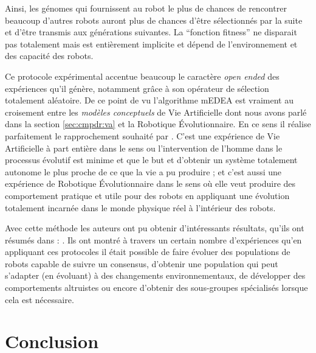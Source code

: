 Ainsi, les génomes qui fournissent au robot le plus de chances de rencontrer beaucoup d'autres robots auront plus de chances d'être sélectionnés par la suite et d'être transmis aux générations suivantes. La ``fonction fitness'' ne disparait pas totalement mais est entièrement implicite et dépend de l'environnement et des capacité des robots.

Ce protocole expérimental accentue beaucoup le caractère \emph{open ended} des expériences qu'il génère, notamment grâce à son opérateur de sélection totalement aléatoire. De ce point de vu l'algorithme mEDEA est vraiment au croisement entre les \emph{modèles conceptuels} de Vie Artificielle dont nous avons parlé dans la section \ref{sec:cmpdr:va} et la Robotique \'Evolutionnaire. En ce sens il réalise parfaitement le rapprochement souhaité par \cite{watson02embodiedevolutiondistributingevolutionaryalgorithmpopulationrobots}. C'est une expérience de Vie Artificielle à part entière dans le sens ou l'intervention de l'homme dans le processus évolutif est minime et que le but et d'obtenir un système totalement autonome le plus proche de ce que la vie a pu produire ; et c'est aussi une expérience de Robotique \'Evolutionnaire dans le sens où elle veut produire des comportement pratique et utile pour des robots en appliquant une évolution totalement incarnée dans le monde physique réel à l'intérieur des robots.

Avec cette méthode les auteurs ont pu obtenir d'intéressants résultats, qu'ils ont résumés dans : \cite{bredeche2012environmentdrivenopenende}. Ils ont montré à travers un certain nombre d'expériences qu'en appliquant ces protocoles il était possible de faire évoluer des populations de robots capable de suivre un consensus, d'obtenir une population qui peut s'adapter (en évoluant) à des changements environnementaux, de développer des comportements altruistes ou encore d'obtenir des sous-groupes spécialisés lorsque cela est nécessaire.



\section{Conclusion}

